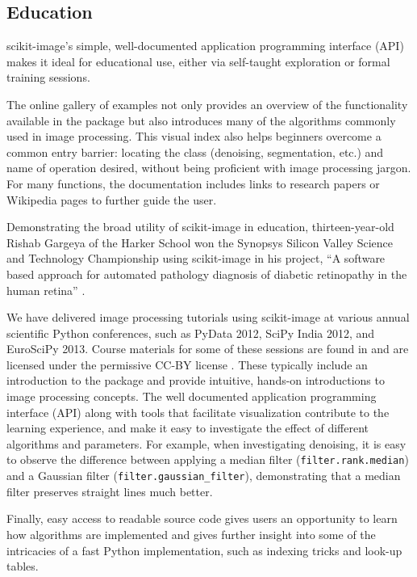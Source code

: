 
  \subsection*{Education}
    \label{education}

    scikit-image's simple, well-documented application programming interface (API) makes it ideal for educational use, either via self-taught exploration or formal training sessions.

    The online gallery of examples not only provides an overview of the functionality available in the package but also introduces many of the algorithms commonly used in image processing. This visual index also helps beginners overcome a common entry barrier: locating the class (denoising, segmentation, etc.) and name of operation desired, without being proficient with image processing jargon.  For many functions, the documentation includes links to research papers or Wikipedia pages to further guide the user.

    Demonstrating the broad utility of scikit-image in education, thirteen-year-old Rishab Gargeya of the Harker School won the Synopsys Silicon Valley Science and Technology Championship using scikit-image in his project, ``A software based approach for automated pathology diagnosis of diabetic retinopathy in the human retina'' \citep{sciencefair}.

    We have delivered image processing tutorials using scikit-image at various annual scientific Python conferences, such as PyData 2012, SciPy India 2012, and EuroSciPy 2013. Course materials for some of these sessions are found in \cite{scipylecturenotes} and are licensed under the permissive CC-BY license \citep{cc-by}. These typically include an introduction to the package and provide intuitive, hands-on introductions to image processing concepts. The well documented application programming interface (API) along with tools that facilitate visualization contribute to the learning experience, and make it easy to investigate the effect of different algorithms and parameters. For example, when investigating denoising, it is easy to observe the difference between applying a median filter (\texttt{filter.rank.median}) and a Gaussian filter (\texttt{filter.gaussian\_filter}), demonstrating that a median filter preserves straight lines much better.

    Finally, easy access to readable source code gives users an opportunity to learn how algorithms are implemented and gives further insight into some of the intricacies of a fast Python implementation, such as indexing tricks and look-up tables.
